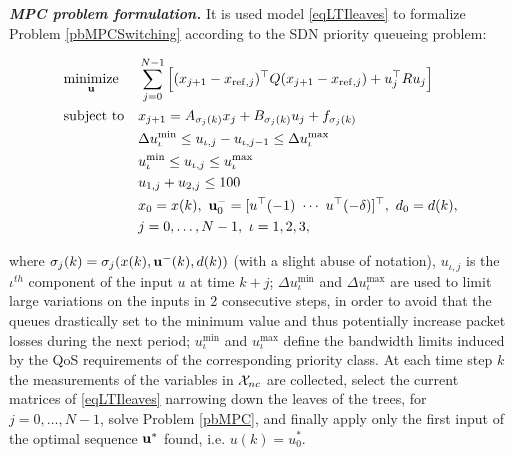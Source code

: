 \textbf{\emph{MPC problem formulation.}} It is used model \eqref{eqLTIleaves} to formalize Problem \ref{pbMPCSwitching} according to the SDN priority queueing problem:
\begin{problem}\label{pbMPC}

	\begin{equation*}
		\begin{aligned}
			& \underset{\bold u}
			{\text{minimize}}               & &  \sum_{j=0}^{N-1} \Big[(x_{j+1}-x_{\mathrm{ref},j})^\top Q (x_{j+1}-x_{\mathrm{ref},j}) + u^\top_{j} R u_{j}\Big]   \\
			& \text{subject to}             & &  x_{j+1}  =   A_{\sigma_j(k)} x_{j}+B_{\sigma_j(k)}  u_j+f_{\sigma_j(k)} \\
			&								& &  \Delta u_\iota^\mathrm{min} \leq u_{\iota,j} - u_{\iota,j-1} \leq \Delta u_\iota^\mathrm{max}             \\
			&								& &  u_\iota^\mathrm{min} \leq u_{\iota,j} \leq u_\iota^\mathrm{max}             \\
			&                               & &  u_{1,j} + u_{2,j} \leq 100			          		\\
			&                               & &  x_0 = x(k),\ \bold u^-_{0} = [u^\top(-1)\ \cdots\ u^\top(-\delta)]^\top,\ d_0 = d(k),\\
			&								& &  j = 0,\ldots,N-1,\ \iota = 1,2,3,                                 
		\end{aligned}
	\end{equation*}
	\normalsize
\end{problem}
\noindent where $\sigma_j(k) = \sigma_j(x(k),\bold{u^-}(k),d(k))$ (with a slight abuse of notation), $u_{\iota,j}$ is the $\iota^{th}$ component of the input $u$ at time $k+j$; $\Delta u_\iota^\mathrm{min}$ and $\Delta u_\iota^\mathrm{max}$ are used to limit large variations on the inputs in 2 consecutive steps, in order to avoid that the queues drastically set to the minimum value and thus potentially increase packet losses during the next period; $u_\iota^\mathrm{min}$ and $u_\iota^\mathrm{max}$ define the bandwidth limits induced by the QoS requirements of the corresponding priority class. At each time step $k$ the measurements of the variables in $\mathcal{X}_{nc}$ are collected, select the current matrices of \eqref{eqLTIleaves} narrowing down the leaves of the trees, for $j = 0,\ldots,N-1$, solve Problem \eqref{pbMPC}, and finally apply only the first input of the optimal sequence $\bold u^*$ found, i.e. $u(k) = u_0^*$.

